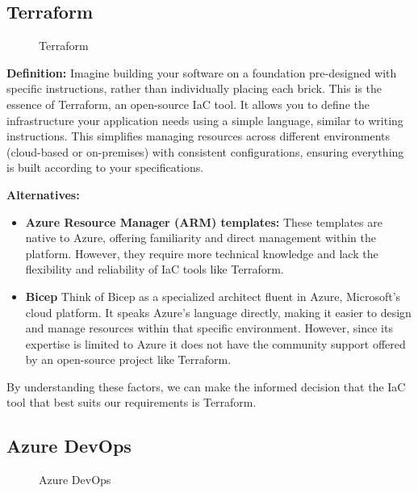 \subsection{Terraform}

\begin{figure}[htpb]
    \centering
    \caption{Terraform}
    \label{fig:terraform}
\end{figure}

\textbf{Definition:} Imagine building your software on a foundation pre-designed with specific instructions, rather than individually placing each brick. This is the essence of Terraform, an open-source IaC tool. It allows you to define the infrastructure your application needs using a simple language, similar to writing instructions. This simplifies managing resources across different environments (cloud-based or on-premises) with consistent configurations, ensuring everything is built according to your specifications.
\par
\textbf{Alternatives:}
\begin{itemize}
    \item \textbf{Azure Resource Manager (ARM) templates:} These templates are native to Azure, offering familiarity and direct management within the platform. However, they require more technical knowledge and lack the flexibility and reliability of IaC tools like Terraform.
    \item \textbf{Bicep} Think of Bicep as a specialized architect fluent in Azure, Microsoft's cloud platform. It speaks Azure's language directly, making it easier to design and manage resources within that specific environment. However, since its expertise is limited to Azure it does not have the community support offered by an open-source project like Terraform.
\end{itemize}
By understanding these factors, we can make the informed decision that the IaC tool that best suits our requirements is Terraform.
\subsection{Azure DevOps}

\begin{figure}[htpb]
    \centering
    \caption{Azure DevOps}
    \label{fig:Azure_DevOps}
\end{figure}

